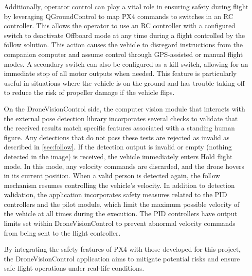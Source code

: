 Additionally, operator control can play a vital role in ensuring safety during flight by leveraging QGroundControl to map PX4 commands to switches in an RC controller. This allows the operator to use an RC controller with a configured switch to deactivate Offboard mode at any time during a flight controlled by the follow solution. This action causes the vehicle to disregard instructions from the companion computer and assume control through GPS-assisted or manual flight modes. A secondary switch can also be configured as a kill switch, allowing for an immediate stop of all motor outputs when needed. This feature is particularly useful in situations where the vehicle is on the ground and has trouble taking off to reduce the risk of propeller damage if the vehicle flips.

On the DroneVisionControl side, the computer vision module that interacts with the external pose detection library incorporates several checks to validate that the received results match specific features associated with a standing human figure. Any detections that do not pass these tests are rejected as invalid as described in \ref{sec:follow}. If the detection output is invalid or empty (nothing detected in the image) is received, the vehicle immediately enters Hold flight mode. In this mode, any velocity commands are discarded, and the drone hovers in its current position. When a valid person is detected again, the follow mechanism resumes controlling the vehicle's velocity. In addition to detection validation, the application incorporates safety measures related to the PID controllers and the pilot module, which limit the maximum possible velocity of the vehicle at all times during the execution. The PID controllers have output limits set within DroneVisionControl to prevent abnormal velocity commands from being sent to the flight controller.


By integrating the safety features of PX4 with those developed for this project, the DroneVisionControl application aims to mitigate potential risks and ensure safe flight operations under real-life conditions.
